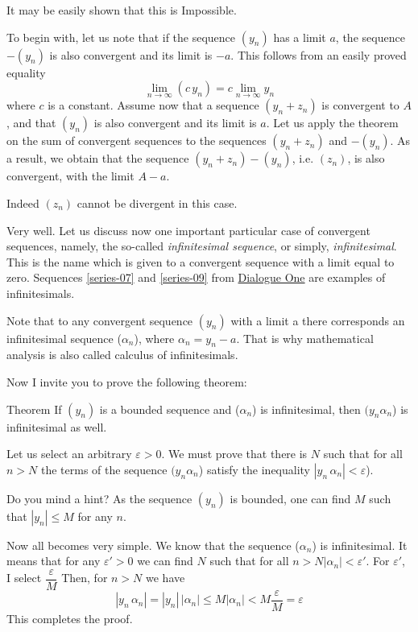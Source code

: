 {\athr It may be easily shown that this is Impossible.

To begin with, let us note that if the sequence $(y_{n})$ has a limit $a$, the sequence $-(y_{n})$ is also convergent and its limit is $-a$. This follows from an easily proved equality
\begin{equation*}%
\lim\limits_{n \to \infty} (c \, y_{n}) = c \lim\limits_{n \to \infty}  y_{n}
\end{equation*}
where $c$ is a constant. Assume now that a sequence $(y_{n}+ z_{n})$ is convergent to $A$, and that $(y_{n})$ is also convergent and its limit is $a$. Let us apply the theorem on the sum of convergent sequences to the sequences $(y_{n}+ z_{n})$ and $-(y_{n})$. As a result, we obtain that the sequence  $(y_{n}+ z_{n}) - (y_{n})$, i.e. $(z_{n})$, is also convergent, with the limit $A-a$.

\rdr Indeed $(z_{n})$ cannot be divergent in this case.

\athr Very well. Let us discuss now one important particular case of convergent sequences, namely, the so-called \emph{infinitesimal sequence}, or simply, \emph{infinitesimal}. This is the name which is given to a convergent sequence with a limit equal to zero. Sequences \eqref{series-07} and \eqref{series-09} from \hyperref[infinite-seq]{Dialogue One} are examples of infinitesimals.

Note that to any convergent sequence $(y_{n})$ with a limit a there corresponds an infinitesimal sequence ($\alpha_{n}$), where $\alpha_{n} = y_{n} - a$. That is why mathematical analysis is also called calculus of infinitesimals.

Now I invite you to prove the following theorem: 
\begin{mytheo}{Theorem}
If $(y_{n})$ is a bounded sequence and ($\alpha_{n}$) is infinitesimal, then $(y_{n}\alpha_{n}$) is infinitesimal as well.
\end{mytheo}
\rdr Let us select an arbitrary  $\varepsilon > 0$. We must prove that there is $N$ such that for all $n > N$ the terms of the sequence $(y_{n}\alpha_{n}$) satisfy the inequality $|y_{n}\, \alpha_{n}| < \varepsilon$).

\athr Do you mind a hint? As the sequence $(y_{n})$ is bounded, one can find $M$ such that $| y_{n}| \leqslant M$ for any $n$.

\rdr Now all becomes very simple. We know that the sequence  ($\alpha_{n}$) is infinitesimal. It means that for any $\varepsilon' > 0$ we can find $N$ such that for all $n > N |\alpha_{n} | < \varepsilon'$. For $\varepsilon'$, I select $\dfrac{\varepsilon}{M}$ Then, for $n > N$ we have
\begin{equation*}%
|y_{n}\, \alpha_{n}| = |y_{n}| \, |\alpha_{n}|  \leqslant M |\alpha_{n}| < M \frac{\varepsilon}{M}  = \varepsilon
\end{equation*}
This completes the proof. 

}
